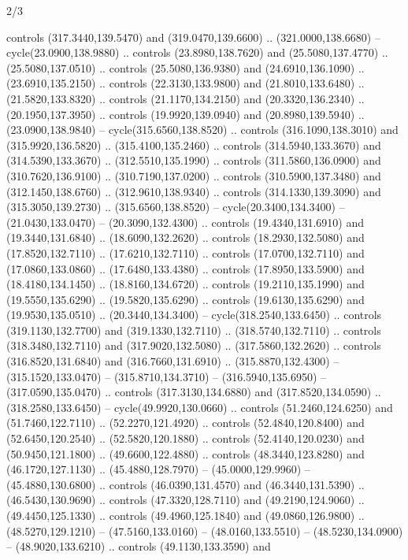 \begin{flagdescription}{2/3}
\begin{scope}[xshift=0.5\flaglength,yshift=0.5\flagwidth,scale=\stretchfactor]
\begin{scope}[scale=0.001645\flagwidth,yshift=65mm,xshift=-63mm]
\begin{scope}[y=0.80pt, x=0.80pt, yscale=-1,]
\begin{scope}[cm={{1.33333,0.0,0.0,1.33333,(0.0,1e-05)}}]
  controls (317.3440,139.5470) and (319.0470,139.6600) .. (321.0000,138.6680) --
  cycle(23.0900,138.9880) .. controls (23.8980,138.7620) and (25.5080,137.4770)
  .. (25.5080,137.0510) .. controls (25.5080,136.9380) and (24.6910,136.1090) ..
  (23.6910,135.2150) .. controls (22.3130,133.9800) and (21.8010,133.6480) ..
  (21.5820,133.8320) .. controls (21.1170,134.2150) and (20.3320,136.2340) ..
  (20.1950,137.3950) .. controls (19.9920,139.0940) and (20.8980,139.5940) ..
  (23.0900,138.9840) -- cycle(315.6560,138.8520) .. controls (316.1090,138.3010)
  and (315.9920,136.5820) .. (315.4100,135.2460) .. controls (314.5940,133.3670)
  and (314.5390,133.3670) .. (312.5510,135.1990) .. controls (311.5860,136.0900)
  and (310.7620,136.9100) .. (310.7190,137.0200) .. controls (310.5900,137.3480)
  and (312.1450,138.6760) .. (312.9610,138.9340) .. controls (314.1330,139.3090)
  and (315.3050,139.2730) .. (315.6560,138.8520) -- cycle(20.3400,134.3400) --
  (21.0430,133.0470) -- (20.3090,132.4300) .. controls (19.4340,131.6910) and
  (19.3440,131.6840) .. (18.6090,132.2620) .. controls (18.2930,132.5080) and
  (17.8520,132.7110) .. (17.6210,132.7110) .. controls (17.0700,132.7110) and
  (17.0860,133.0860) .. (17.6480,133.4380) .. controls (17.8950,133.5900) and
  (18.4180,134.1450) .. (18.8160,134.6720) .. controls (19.2110,135.1990) and
  (19.5550,135.6290) .. (19.5820,135.6290) .. controls (19.6130,135.6290) and
  (19.9530,135.0510) .. (20.3440,134.3400) -- cycle(318.2540,133.6450) ..
  controls (319.1130,132.7700) and (319.1330,132.7110) .. (318.5740,132.7110) ..
  controls (318.3480,132.7110) and (317.9020,132.5080) .. (317.5860,132.2620) ..
  controls (316.8520,131.6840) and (316.7660,131.6910) .. (315.8870,132.4300) --
  (315.1520,133.0470) -- (315.8710,134.3710) -- (316.5940,135.6950) --
  (317.0590,135.0470) .. controls (317.3130,134.6880) and (317.8520,134.0590) ..
  (318.2580,133.6450) -- cycle(49.9920,130.0660) .. controls (51.2460,124.6250)
  and (51.7460,122.7110) .. (52.2270,121.4920) .. controls (52.4840,120.8400)
  and (52.6450,120.2540) .. (52.5820,120.1880) .. controls (52.4140,120.0230)
  and (50.9450,121.1800) .. (49.6600,122.4880) .. controls (48.3440,123.8280)
  and (46.1720,127.1130) .. (45.4880,128.7970) -- (45.0000,129.9960) --
  (45.4880,130.6800) .. controls (46.0390,131.4570) and (46.3440,131.5390) ..
  (46.5430,130.9690) .. controls (47.3320,128.7110) and (49.2190,124.9060) ..
  (49.4450,125.1330) .. controls (49.4960,125.1840) and (49.0860,126.9800) ..
  (48.5270,129.1210) -- (47.5160,133.0160) -- (48.0160,133.5510) --
  (48.5230,134.0900) -- (48.9020,133.6210) .. controls (49.1130,133.3590) and

\end{scope}
\end{scope}
\end{scope}
\end{scope}
\end{flagdescription}
